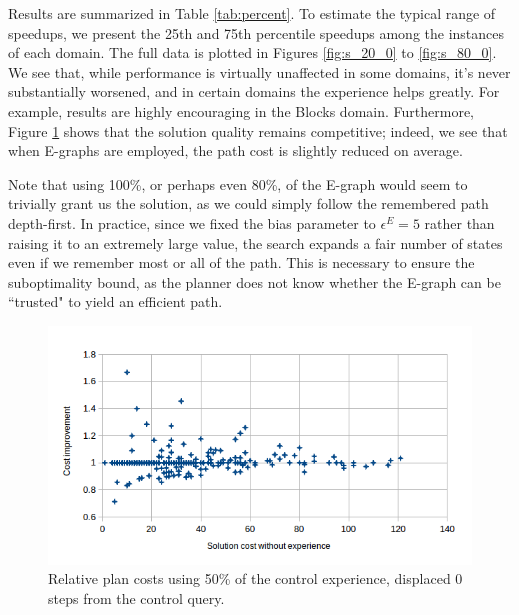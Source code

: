 \documentclass[letterpaper]{article}
\begin{document}
Results are summarized in Table \ref{tab:percent}.
To estimate the typical range of speedups, we present the 25th and 75th percentile speedups among the instances of each domain.
The full data is plotted in Figures \ref{fig:s_20_0} to \ref{fig:s_80_0}.
We see that, while performance is virtually unaffected in some domains, it's never substantially worsened, and in certain domains the experience helps greatly.
For example, results are highly encouraging in the Blocks domain.
Furthermore, Figure \ref{fig:c_50_0} shows that the solution quality remains competitive; indeed, we see that when E-graphs are employed, the path cost is slightly reduced on average.

Note that using 100\%, or perhaps even 80\%, of the E-graph would seem to trivially grant us the solution, as we could simply follow the remembered path depth-first.
In practice, since we fixed the bias parameter to $\epsilon^E=5$ rather than raising it to an extremely large value, the search expands a fair number of states even if we remember most or all of the path.
This is necessary to ensure the suboptimality bound, as the planner does not know whether the E-graph can be ``trusted" to yield an efficient path.

\begin{figure}
	\centering
	\includegraphics[scale=0.5]{Cost_50_0.png}
	\caption{Relative plan costs using 50\% of the control experience, displaced 0 steps from the control query.}
	 \label{fig:c_50_0}
\end{figure}
\end{document}
